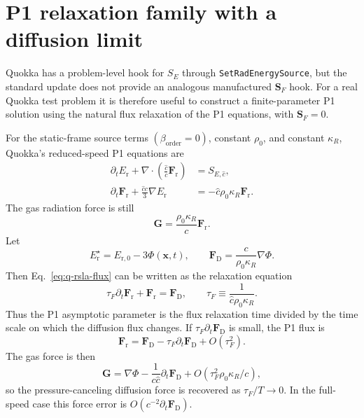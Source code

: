 \documentclass[11pt]{article}
\newcommand{\Div}{\nabla\!\cdot}
\newcommand{\Grad}{\nabla}
\newcommand{\Er}{E_{\mathrm r}}
\newcommand{\Fr}{\bm{F}_{\mathrm r}}
\newcommand{\FrD}{\bm{F}_{\mathrm D}}
\newcommand{\Gmom}{\bm{G}}
\newcommand{\ShatE}{S_E}
\newcommand{\ShatF}{\bm{S}_F}
\newcommand{\chat}{\hat{c}}
\newcommand{\Erzero}{E_{\mathrm r,0}}
\newcommand{\SErsla}{S_{E,\hat{c}}}
\begin{document}
\section{P1 relaxation family with a diffusion limit}

Quokka has a problem-level hook for \(\ShatE\) through
\texttt{SetRadEnergySource}, but the standard update does not provide an
analogous manufactured \(\ShatF\) hook.  For a real Quokka test problem it is
therefore useful to construct a finite-parameter P1 solution using the natural
flux relaxation of the P1 equations, with \(\ShatF=0\).

For the static-frame source terms \((\beta_{\mathrm{order}}=0)\), constant
\(\rho_0\), and constant \(\kappa_R\), Quokka's reduced-speed P1 equations
are
\begin{align}
  \partial_t\Er + \Div\left(\frac{\chat}{c}\Fr\right)
  &= \SErsla, \label{eq:q-rsla-energy}\\
  \partial_t\Fr + \frac{\chat c}{3}\Grad\Er
  &= -\chat\rho_0\kappa_R\Fr. \label{eq:q-rsla-flux}
\end{align}
The gas radiation force is still
\begin{equation}
  \Gmom = \frac{\rho_0\kappa_R}{c}\Fr.
  \label{eq:q-rsla-force}
\end{equation}
Let
\begin{equation}
  \Er^\star = \Erzero - 3\Phi(\bm{x},t),
  \qquad
  \FrD = \frac{c}{\rho_0\kappa_R}\Grad\Phi.
  \label{eq:p1-diffusion-target}
\end{equation}
Then Eq.~\eqref{eq:q-rsla-flux} can be written as the relaxation equation
\begin{equation}
  \tau_F \partial_t\Fr + \Fr = \FrD,
  \qquad
  \tau_F \equiv \frac{1}{\chat\rho_0\kappa_R}.
  \label{eq:p1-relaxation}
\end{equation}
Thus the P1 asymptotic parameter is the flux relaxation time divided by the
time scale on which the diffusion flux changes.  If
\(\tau_F \partial_t \FrD\) is small, the P1 flux is
\begin{equation}
  \Fr = \FrD - \tau_F\partial_t\FrD
  + O(\tau_F^2).
  \label{eq:p1-relaxation-expansion}
\end{equation}
The gas force is then
\begin{equation}
  \Gmom
  =
  \Grad\Phi
  - \frac{1}{c\chat}\partial_t\FrD
  + O(\tau_F^2\rho_0\kappa_R/c),
  \label{eq:p1-force-error}
\end{equation}
so the pressure-canceling diffusion force is recovered as
\(\tau_F/T\to0\).  In the full-speed case this force error is
\(O(c^{-2}\partial_t\FrD)\).
\end{document}
